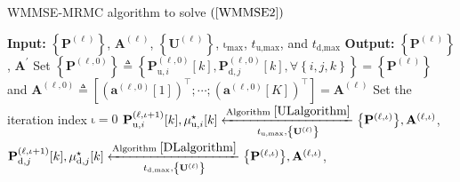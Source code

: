 \documentclass[10pt,journal]{IEEEtran}
\newcommand{\paren}[1]{\left({#1}\right)}
\newcommand{\bracket}[1]{{\left [{#1}\right ]}}
\newcommand{\braces}[1]{{\left\{ {#1}\right\}}}
\theoremstyle{definition}
\begin{document}
\begin{algorithm}[ht!]
\par\noindent\small
\caption{WMMSE-MRMC algorithm to solve $\paren{\ref{WMMSE2}}$}
\label{convexalgorithm}
\begin{algorithmic}[1]
	\Statex \textbf{Input:} $\braces{\mathbf{P}^{\paren{\mathrm{\ell}}}}$, $\mathbf{A}^{\paren{\mathrm{\ell}}}$, $\braces{\mathbf{U}^{\paren{\mathrm{\ell}}}}$, $\mathrm{\iota}_{\textrm{max}}$, $t_{\textrm{u,max}}$, and $t_{\textrm{d,max}}$
	\Statex \textbf{Output: } $\braces{\mathbf{P}^{\paren{\ell}}}$, $\mathbf{A}^{\prime}$
	\State Set $\braces{\mathbf{P}^{\paren{\mathrm{\ell,0}}}}\triangleq\braces{\mathbf{P}^{\paren{\mathrm{\ell,0}}}_{\textrm{u},i}\bracket{k},\mathbf{P}^{\paren{\mathrm{\ell,0}}}_{\textrm{d},j}\bracket{k}, \forall \braces{i,j,k}}=\braces{\mathbf{P}^{\paren{\mathrm{\ell}}}}
	$ and $\mathbf{A}^{\paren{\mathrm{\ell,0}}}\triangleq\bracket{\paren{\mathbf{a}^{\paren{\mathrm{\ell,0}}}\bracket{1}}^\top;\cdots;\paren{\mathbf{a}^{\paren{\mathrm{\ell,0}}}\bracket{\mathrm{\mathit{K}}}}^\top}=\mathbf{A}^{\paren{\mathrm{\ell}}}$
	\State Set the iteration index $\mathrm{\iota}=0$ 
	\Repeat
	\label{stepk} %
	\State $\mathbf{P}^{\paren{\mathrm{\ell,\iota+1}}}_{\textrm{u},i}\bracket{k},\mu^\star_{\textrm{u},i}\bracket{k}\xleftarrow[t_{\textrm{u,max}},\braces{\mathbf{U}^{\paren{\mathrm{\ell}}}}]{\textrm{Algorithm }\ref{ULalgorithm}}\braces{\mathbf{P}^{\paren{\mathrm{\ell,\iota}}}},\mathbf{A}^{\paren{\mathrm{\ell,\iota}}}$, %
	\EndFor
	\State %
	$\mathbf{P}^{\paren{\mathrm{\ell,\iota+1}}}_{\textrm{d},j}\bracket{k},\mu^\star_{\textrm{d},j}\bracket{k}\xleftarrow[t_{\textrm{d,max}},\braces{\mathbf{U}^{\paren{\mathrm{\ell}}}}]{\textrm{Algorithm }\ref{DLalgorithm}}\braces{\mathbf{P}^{\paren{\mathrm{\ell,\iota}}}},\mathbf{A}^{\paren{\mathrm{\ell,\iota}}}$, %

\end{algorithmic}
\end{algorithm}
\end{document}
